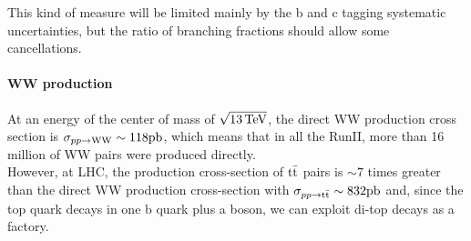 This kind of measure will be limited mainly by the b and c tagging systematic uncertainties, but the ratio of branching fractions should allow some cancellations.
\paragraph*{WW production}
At an energy of the center of mass of $\sqrt{13 {\,\text{Te\hspace{-.08em}V}}}$, the direct WW production cross section is $\sigma_{pp\to{\ensuremath{\text{W}}}{\ensuremath{\text{W}}}}\sim118 \text{pb}$, which means that in all the RunII, more than 16 million of WW pairs were produced directly.\\
However, at LHC, the production cross-section of ${{\text{t}}{\bar{\text{t}}}}$ pairs is $\sim 7$ times greater than the direct WW production cross-section with $\sigma_{pp\to {\ensuremath{{\text{t}}{\bar{\text{t}}}}}}\sim832\text{pb}$ and, since the top quark decays in one b quark plus a \PW boson, we can exploit di-top decays as a \PW\PW factory.
\newpage
